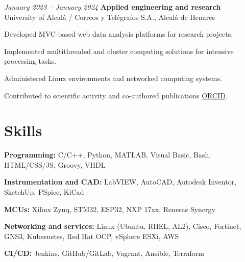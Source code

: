 \begin{twocolentry}{\textit{January 2023 – January 2024}}
	\textbf{Applied engineering and research} \\
	University of Alcalá / Correos y Telégrafos S.A., Alcalá de Henares
\end{twocolentry}
\begin{onecolentry}
	\begin{highlights}
		\item Developed MVC-based web data analysis platforms for research projects.
		\item Implemented multithreaded and cluster computing solutions for intensive processing tasks.
		\item Administered Linux environments and networked computing systems.
		\item Contributed to scientific activity and co-authored publications \href{https://orcid.org/0009-0000-6862-1872}{ORCID}.
	\end{highlights}
\end{onecolentry}

\vspace{-7pt}

\section{Skills}

\begin{onecolentry}
	\textbf{Programming:} C/C++, Python, MATLAB, Visual Basic, Bash, HTML/CSS/JS, Groovy, VHDL
\end{onecolentry}
\begin{onecolentry}
	\textbf{Instrumentation and CAD:} LabVIEW, AutoCAD, Autodesk Inventor, SketchUp, PSpice, KiCad
\end{onecolentry}
\begin{onecolentry}
	\textbf{MCUs:} Xilinx Zynq, STM32, ESP32, NXP 17xx, Renesas Synergy
\end{onecolentry}
\begin{onecolentry}
	\textbf{Networking and services:} Linux (Ubuntu, RHEL, AL2), Cisco, Fortinet, GNS3, Kubernetes, Red Hat OCP, vSphere ESXi, AWS
\end{onecolentry}
\begin{onecolentry}
	\textbf{CI/CD:} Jenkins, GitHub/GitLab, Vagrant, Ansible, Terraform
\end{onecolentry}
